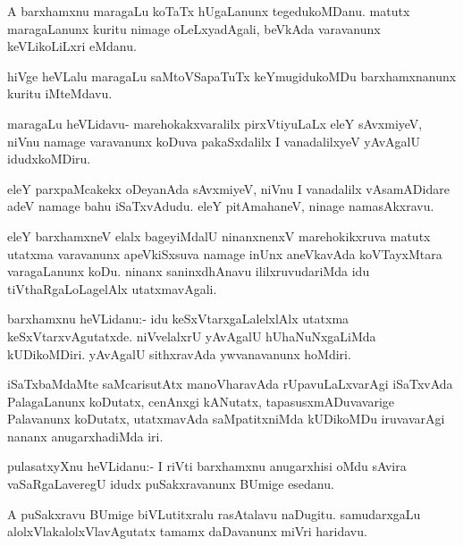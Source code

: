 \documentclass{article}
\begin{document}
\begin{mn}
A barxhamxnu maragaLu koTaTx hUgaLanunx tegedukoMDanu. matutx
maragaLanunx kuritu nimage oLeLxyadAgali, beVkAda varavanunx
keVLikoLiLxri eMdanu.
\end{mn}

\begin{mn}%
hiVge heVLalu maragaLu saMtoVSapaTuTx keYmugidukoMDu barxhamxnanunx
kuritu iMteMdavu.
\end{mn}

\begin{mn}
maragaLu heVLidavu- marehokakxvaralilx pirxVtiyuLaLx eleY sAvxmiyeV,
niVnu namage varavanunx koDuva pakaSxdalilx I vanadalilxyeV yAvAgalU idudxkoMDiru.
\end{mn}

\begin{mn}
eleY parxpaMcakekx oDeyanAda sAvxmiyeV, niVnu I vanadalilx
vAsamADidare adeV namage bahu iSaTxvAdudu. eleY pitAmahaneV, ninage namasAkxravu.
\end{mn}

\begin{mn}
eleY barxhamxneV elalx bageyiMdalU ninanxnenxV marehokikxruva matutx
utatxma varavanunx apeVkiSxsuva namage inUnx aneVkavAda koVTayxMtara
varagaLanunx koDu. ninanx saninxdhAnavu ililxruvudariMda idu
tiVthaRgaLoLagelAlx utatxmavAgali.
\end{mn}

\begin{mn}
barxhamxnu heVLidanu:- idu keSxVtarxgaLalelxlAlx utatxma
keSxVtarxvAgutatxde. niVvelalxrU yAvAgalU hUhaNuNxgaLiMda
kUDikoMDiri. yAvAgalU sithxravAda ywvanavanunx hoMdiri.
\end{mn}

\begin{mn}
iSaTxbaMdaMte saMcarisutAtx manoVharavAda rUpavuLaLxvarAgi iSaTxvAda
PalagaLanunx koDutatx, cenAnxgi kANutatx, tapasusxmADuvavarige
Palavanunx koDutatx, utatxmavAda saMpatitxniMda kUDikoMDu iruvavarAgi
nananx anugarxhadiMda iri.
\end{mn}

\begin{mn}
pulasatxyXnu heVLidanu:- I riVti barxhamxnu anugarxhisi oMdu sAvira
vaSaRgaLaveregU idudx puSakxravanunx BUmige esedanu.
\end{mn}

\begin{mn}%
A puSakxravu BUmige biVLutitxralu rasAtalavu naDugitu. samudarxgaLu
alolxVlakalolxVlavAgutatx tamamx daDavanunx miVri haridavu.
\end{mn}
\end{document}
